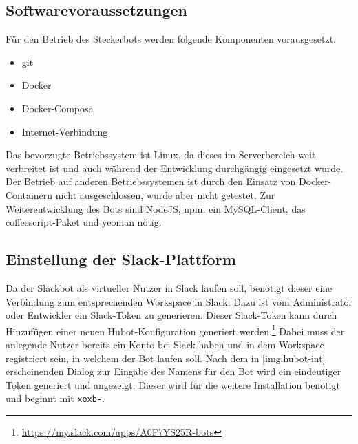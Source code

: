 
\subsection{Softwarevoraussetzungen}
Für den Betrieb des Steckerbots werden folgende Komponenten vorausgesetzt:

\begin{itemize}
\item git
\item Docker
\item Docker-Compose
\item Internet-Verbindung
\end{itemize}

Das bevorzugte Betriebssystem ist Linux, da dieses im Serverbereich weit verbreitet ist und auch während der Entwicklung durchgängig eingesetzt wurde. Der Betrieb auf anderen Betriebssystemen ist durch den Einsatz von Docker-Containern nicht ausgeschlossen, wurde aber nicht getestet.
Zur Weiterentwicklung des Bots sind NodeJS, npm, ein MySQL-Client, das coffeescript-Paket und yeoman nötig.

\subsection{Einstellung der Slack-Plattform}
Da der Slackbot als virtueller Nutzer in Slack laufen soll, benötigt dieser eine Verbindung zum entsprechenden Workspace in Slack. Dazu ist vom Administrator oder Entwickler ein Slack-Token zu generieren.
Dieser Slack-Token kann durch Hinzufügen einer neuen Hubot-Konfiguration generiert werden.\footnote{\url{https://my.slack.com/apps/A0F7YS25R-bots}} Dabei muss der anlegende Nutzer bereits ein Konto bei Slack haben und in dem Workspace registriert sein, in welchem der Bot laufen soll.
Nach dem in \autoref{img:hubot-int} erscheinenden Dialog zur Eingabe des Namens für den Bot wird ein eindeutiger Token generiert und angezeigt. Dieser wird für die weitere Installation benötigt und beginnt mit \texttt{xoxb-}.

